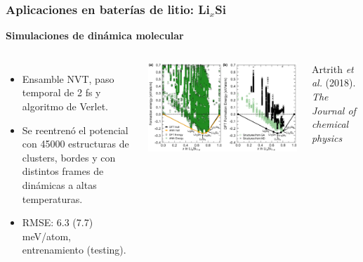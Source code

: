 \documentclass[aspectratio=169]{beamer}
\let\oldtextbf\textbf
\renewcommand{\textbf}[1]{\textcolor{nordblue}{\oldtextbf{#1}}}
\begin{document}
    \begin{frame}
        \frametitle{Aplicaciones en baterías de litio: Li$_x$Si}
        
        \textbf{Simulaciones de dinámica molecular}
        
        \begin{columns}
            \begin{itemize}
                \item Ensamble NVT, paso temporal de 2 fs y algoritmo de Verlet.
                \item Se reentrenó el potencial con 45000 estructuras de clusters, 
                    bordes y con distintos frames de dinámicas a altas
                    temperaturas.
                \item RMSE: 6.3 (7.7) meV/atom, entrenamiento (testing).
            \end{itemize}

            \pause

            \begin{center}
                \includegraphics[width=\columnwidth]{LiSi-energias_de_formacion.png}
            \end{center}
            \tiny{Artrith \textit{et al.} (2018). \textit{The Journal of chemical
            physics}}
        \end{columns}
            
    \end{frame}
    
\end{document}
